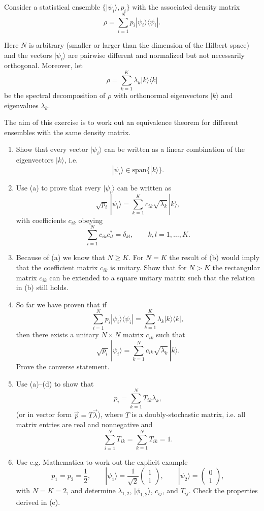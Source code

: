 \begin{Problem}
Consider a statistical ensemble $\{|\psi_i\rangle,p_i\}$ with the associated
density matrix
\[
\rho=\sum_{i=1}^{N} p_i |\psi_i\rangle\langle\psi_i|.
\]

Here $N$ is arbitrary (smaller or larger than the dimension of the Hilbert
space) and the vectors $|\psi_i\rangle$ are pairwise different and normalized
but not necessarily orthogonal. Moreover, let
\[
\rho=\sum_{k=1}^{K}\lambda_k |k\rangle\langle k|
\]
be the spectral decomposition of $\rho$ with orthonormal eigenvectors $|k\rangle$
and eigenvalues $\lambda_k$.

The aim of this exercise is to work out an equivalence theorem for different
ensembles with the same density matrix.

\begin{enumerate}
\item[(a)] Show that every vector $|\psi_i\rangle$ can be written as a linear
combination of the eigenvectors $|k\rangle$, i.e.
\[
|\psi_i\rangle\in \mathrm{span}\{|k\rangle\}.
\]

\item[(b)] Use (a) to prove that every $|\psi_i\rangle$ can be written as
\[
\sqrt{p_i}\,|\psi_i\rangle
=
\sum_{k=1}^{K}
c_{ik}\sqrt{\lambda_k}\,|k\rangle,
\]
with coefficients $c_{ik}$ obeying
\[
\sum_{i=1}^{N} c_{ik}c_{il}^{*}
=
\delta_{kl},
\qquad
k,l=1,\dots,K.
\]

\item[(c)] Because of (a) we know that $N\ge K$. For $N=K$ the result of (b)
would imply that the coefficient matrix $c_{ik}$ is unitary. Show that for
$N>K$ the rectangular matrix $c_{ik}$ can be extended to a square unitary
matrix such that the relation in (b) still holds.

\item[(d)] So far we have proven that if
\[
\sum_{i=1}^{N} p_i |\psi_i\rangle\langle\psi_i|
=
\sum_{k=1}^{K}\lambda_k |k\rangle\langle k|,
\]
then there exists a unitary $N\times N$ matrix $c_{ik}$ such that
\[
\sqrt{p_i}\,|\psi_i\rangle
=
\sum_{k=1}^{N}
c_{ik}\sqrt{\lambda_k}\,|k\rangle.
\]
Prove the converse statement.

\item[(e)] Use (a)--(d) to show that
\[
p_i=\sum_{k=1}^{N} T_{ik}\lambda_k,
\]
(or in vector form $\vec p=T\vec\lambda$),
where $T$ is a doubly-stochastic matrix, i.e. all matrix entries are real
and nonnegative and
\[
\sum_{i=1}^{N}T_{ik}
=
\sum_{k=1}^{N}T_{ik}
=
1.
\]

\item[(f)] Use e.g. Mathematica to work out the explicit example
\[
p_1=p_2=\frac12,
\qquad
|\psi_1\rangle
=
\frac1{\sqrt2}
\begin{pmatrix}
1\\
1
\end{pmatrix},
\qquad
|\psi_2\rangle
=
\begin{pmatrix}
0\\
1
\end{pmatrix},
\]
with $N=K=2$, and determine
$\lambda_{1,2}$, $|\phi_{1,2}\rangle$, $c_{ij}$, and $T_{ij}$.
Check the properties derived in (e).
\end{enumerate}
\end{Problem}
